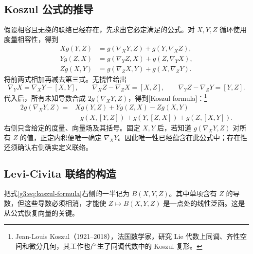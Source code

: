 \subsection{Koszul 公式的推导}
\label{g3:subsec:0102:02}

假设相容且无挠的联络已经存在，先求出它必定满足的公式。对 \(X,Y,Z\) 循环使用度量相容性，得到
\begin{align*}
	Xg(Y,Z)&=g(\nabla_XY,Z)+g(Y,\nabla_XZ),\\
	Yg(Z,X)&=g(\nabla_YZ,X)+g(Z,\nabla_YX),\\
	Zg(X,Y)&=g(\nabla_ZX,Y)+g(X,\nabla_ZY).
\end{align*}
将前两式相加再减去第三式。无挠性给出
\[
	\nabla_YX=\nabla_XY-[X,Y],\qquad
	\nabla_XZ-\nabla_ZX=[X,Z],\qquad
	\nabla_YZ-\nabla_ZY=[Y,Z].
\]
代入后，所有未知导数合成 \(2g(\nabla_XY,Z)\)，得到[Koszul formula]：\footnote{Jean-Louis Koszul（1921--2018），法国数学家，研究 Lie 代数上同调、齐性空间和微分几何，其工作也产生了同调代数中的 Koszul 复形。}
\begin{equation}\label{g3:eq:koszul-formula}
	\begin{aligned}
		2g(\nabla_XY,Z)
		={}&Xg(Y,Z)+Yg(Z,X)-Zg(X,Y)\\
		&-g(X,[Y,Z])+g(Y,[Z,X])+g(Z,[X,Y]).
	\end{aligned}
\end{equation}
右侧只含给定的度量、向量场及其括号。固定 \(X,Y\) 后，若知道 \(g(\nabla_XY,Z)\) 对所有 \(Z\) 的值，正定内积便唯一确定 \(\nabla_XY\)。因此唯一性已经蕴含在此公式中；存在性还须确认右侧确实定义联络。

\subsection{Levi-Civita 联络的构造}
\label{g3:subsec:0102:03}

把式\eqref{g3:eq:koszul-formula}右侧的一半记为 \(B(X,Y,Z)\)。其中单项含有 \(Z\) 的导数，但这些导数必须相消，才能使 \(Z\mapsto B(X,Y,Z)\) 是一点处的线性泛函。这是从公式恢复向量的关键。

